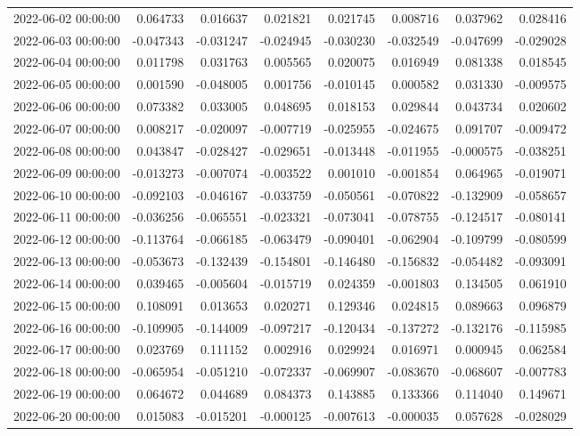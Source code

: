 \begin{tabular}{lrrrrrrr}
2022-06-02 00:00:00 & 0.064733 & 0.016637 & 0.021821 & 0.021745 & 0.008716 & 0.037962 & 0.028416 \\
2022-06-03 00:00:00 & -0.047343 & -0.031247 & -0.024945 & -0.030230 & -0.032549 & -0.047699 & -0.029028 \\
2022-06-04 00:00:00 & 0.011798 & 0.031763 & 0.005565 & 0.020075 & 0.016949 & 0.081338 & 0.018545 \\
2022-06-05 00:00:00 & 0.001590 & -0.048005 & 0.001756 & -0.010145 & 0.000582 & 0.031330 & -0.009575 \\
2022-06-06 00:00:00 & 0.073382 & 0.033005 & 0.048695 & 0.018153 & 0.029844 & 0.043734 & 0.020602 \\
2022-06-07 00:00:00 & 0.008217 & -0.020097 & -0.007719 & -0.025955 & -0.024675 & 0.091707 & -0.009472 \\
2022-06-08 00:00:00 & 0.043847 & -0.028427 & -0.029651 & -0.013448 & -0.011955 & -0.000575 & -0.038251 \\
2022-06-09 00:00:00 & -0.013273 & -0.007074 & -0.003522 & 0.001010 & -0.001854 & 0.064965 & -0.019071 \\
2022-06-10 00:00:00 & -0.092103 & -0.046167 & -0.033759 & -0.050561 & -0.070822 & -0.132909 & -0.058657 \\
2022-06-11 00:00:00 & -0.036256 & -0.065551 & -0.023321 & -0.073041 & -0.078755 & -0.124517 & -0.080141 \\
2022-06-12 00:00:00 & -0.113764 & -0.066185 & -0.063479 & -0.090401 & -0.062904 & -0.109799 & -0.080599 \\
2022-06-13 00:00:00 & -0.053673 & -0.132439 & -0.154801 & -0.146480 & -0.156832 & -0.054482 & -0.093091 \\
2022-06-14 00:00:00 & 0.039465 & -0.005604 & -0.015719 & 0.024359 & -0.001803 & 0.134505 & 0.061910 \\
2022-06-15 00:00:00 & 0.108091 & 0.013653 & 0.020271 & 0.129346 & 0.024815 & 0.089663 & 0.096879 \\
2022-06-16 00:00:00 & -0.109905 & -0.144009 & -0.097217 & -0.120434 & -0.137272 & -0.132176 & -0.115985 \\
2022-06-17 00:00:00 & 0.023769 & 0.111152 & 0.002916 & 0.029924 & 0.016971 & 0.000945 & 0.062584 \\
2022-06-18 00:00:00 & -0.065954 & -0.051210 & -0.072337 & -0.069907 & -0.083670 & -0.068607 & -0.007783 \\
2022-06-19 00:00:00 & 0.064672 & 0.044689 & 0.084373 & 0.143885 & 0.133366 & 0.114040 & 0.149671 \\
2022-06-20 00:00:00 & 0.015083 & -0.015201 & -0.000125 & -0.007613 & -0.000035 & 0.057628 & -0.028029 \\

\end{tabular}
